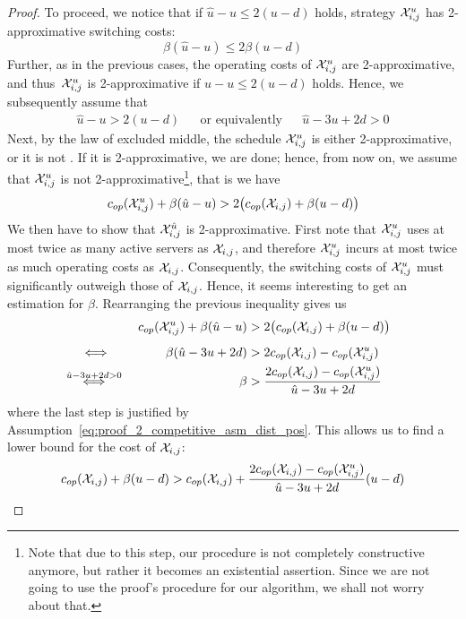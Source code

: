 \begin{proof}
To proceed, we notice that if $\hat{u}-u\le2(u-d)$ holds, strategy $\mathcal{X}_{i,j}^u$ has 2-approximative switching costs:
\begin{equation*}
	\beta(\hat{u}-u)\le2\beta(u-d)
\end{equation*}
Further, as in the previous cases, the operating costs of $\mathcal{X}_{i,j}^u$ are 2-approximative, and thus~$\mathcal{X}_{i,j}^u$ is 2-approximative if $\hat{u}-u\le2(u-d)$ holds. Hence, we subsequently assume that 
\begin{align}\label{eq:proof_2_competitive_asm_dist_pos}
	\hat{u}-u>2(u-d)&&\text{or equivalently}&&\hat{u}-3u+2d>0
\end{align}
Next, by the law of excluded middle, the schedule $\mathcal{X}_{i,j}^u$ is either 2-approximative, or it is not . If it is 2-approximative, we are done; hence, from now on, we assume that $\mathcal{X}_{i,j}^u$ is not 2-approximative\footnote{Note that due to this step, our procedure is not completely constructive anymore, but rather it becomes an existential assertion. Since we are not going to use the proof's procedure for our algorithm, we shall not worry about that.}, that is we have 
\begin{equation*}
	c_{op}(\mathcal{X}_{i,j}^u)+\beta(\hat{u}-u)>2\bigl(c_{op}(\mathcal{X}_{i,j})+\beta(u-d)\bigr)
\end{equation*}
We then have to show that $\mathcal{X}_{i,j}^{\hat{u}}$ is 2-approximative.
First note that $\mathcal{X}_{i,j}^u$ uses at most twice as many active servers as $\mathcal{X}_{i,j}$, and therefore $\mathcal{X}_{i,j}^u$ incurs at most twice as much operating costs as $\mathcal{X}_{i,j}$. Consequently, the switching costs of $\mathcal{X}_{i,j}^u$ must significantly outweigh those of $\mathcal{X}_{i,j}$. Hence, it seems interesting to get an estimation for $\beta$. Rearranging the previous inequality gives us
\begin{align*}
	&&\opcosts(\mx_{i,j}^u)+\beta(\hat{u}-u)&>2\bigl(\opcosts(\mx_{i,j})+\beta(u-d)\bigr)&\\
	&\stackrel{\phantom{\hat{u}-3u+2d)>0}}{\iff}&\beta(\hat{u}-3u+2d)&>2\opcosts(\mx_{i,j})-\opcosts(\mx_{i,j}^u)&\\
	&\stackrel{\hat{u}-3u+2d>0}{\iff}&\beta&>\frac{2\opcosts(\mx_{i,j})-\opcosts(\mx_{i,j}^u)}{\hat{u}-3u+2d}
\end{align*}
where the last step is justified by Assumption~\eqref{eq:proof_2_competitive_asm_dist_pos}.
This allows us to find a lower bound for the cost of $\mathcal{X}_{i,j}$:
\begin{align*}
	\opcosts(\mx_{i,j})+\beta(u-d)&>\opcosts(\mx_{i,j})+\frac{2\opcosts(\mx_{i,j})-\opcosts(\mx_{i,j}^u)}{\hat{u}-3u+2d}(u-d)\\

\end{align*}
\end{proof}
